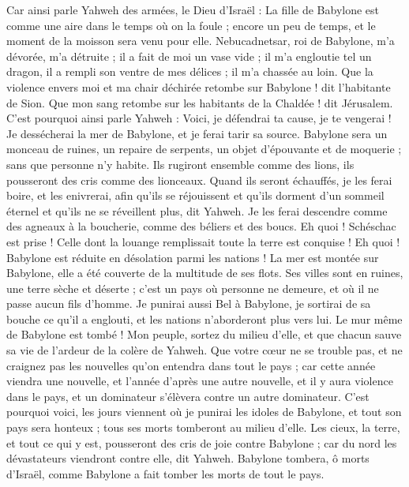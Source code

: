 \begin{multicols}{2}
Car ainsi parle Yahweh des armées, le Dieu d'Israël : La fille de Babylone est comme une aire dans le temps où on la foule ; encore un peu de temps, et le moment de la moisson sera venu pour elle.
Nebucadnetsar, roi de Babylone, m'a dévorée, m'a détruite ; il a fait de moi un vase vide ; il m'a engloutie tel un dragon, il a rempli son ventre de mes délices ; il m'a chassée au loin.
Que la violence envers moi et ma chair déchirée retombe sur Babylone ! dit l'habitante de Sion. Que mon sang retombe sur les habitants de la Chaldée ! dit Jérusalem.
C'est pourquoi ainsi parle Yahweh : Voici, je défendrai ta cause, je te vengerai ! Je dessécherai la mer de Babylone, et je ferai tarir sa source.
Babylone sera un monceau de ruines, un repaire de serpents, un objet d'épouvante et de moquerie ; sans que personne n'y habite.
Ils rugiront ensemble comme des lions, ils pousseront des cris comme des lionceaux.
Quand ils seront échauffés, je les ferai boire, et les enivrerai, afin qu'ils se réjouissent et qu'ils dorment d'un sommeil éternel et qu'ils ne se réveillent plus, dit Yahweh.
Je les ferai descendre comme des agneaux à la boucherie, comme des béliers et des boucs.
Eh quoi ! Schéschac est prise ! Celle dont la louange remplissait toute la terre est conquise ! Eh quoi ! Babylone est réduite en désolation parmi les nations !
La mer est montée sur Babylone, elle a été couverte de la multitude de ses flots.
Ses villes sont en ruines, une terre sèche et déserte ; c'est un pays où personne ne demeure, et où il ne passe aucun fils d'homme.
Je punirai aussi Bel à Babylone, je sortirai de sa bouche ce qu'il a englouti, et les nations n'aborderont plus vers lui. Le mur même de Babylone est tombé !
Mon peuple, sortez du milieu d'elle, et que chacun sauve sa vie de l'ardeur de la colère de Yahweh.
Que votre cœur ne se trouble pas, et ne craignez pas les nouvelles qu'on entendra dans tout le pays ; car cette année viendra une nouvelle, et l'année d'après une autre nouvelle, et il y aura violence dans le pays, et un dominateur s'élèvera contre un autre dominateur.
C'est pourquoi voici, les jours viennent où je punirai les idoles de Babylone, et tout son pays sera honteux ; tous ses morts tomberont au milieu d'elle.
Les cieux, la terre, et tout ce qui y est, pousseront des cris de joie contre Babylone ; car du nord les dévastateurs viendront contre elle, dit Yahweh.
Babylone tombera, ô morts d'Israël, comme Babylone a fait tomber les morts de tout le pays.

\end{multicols}
